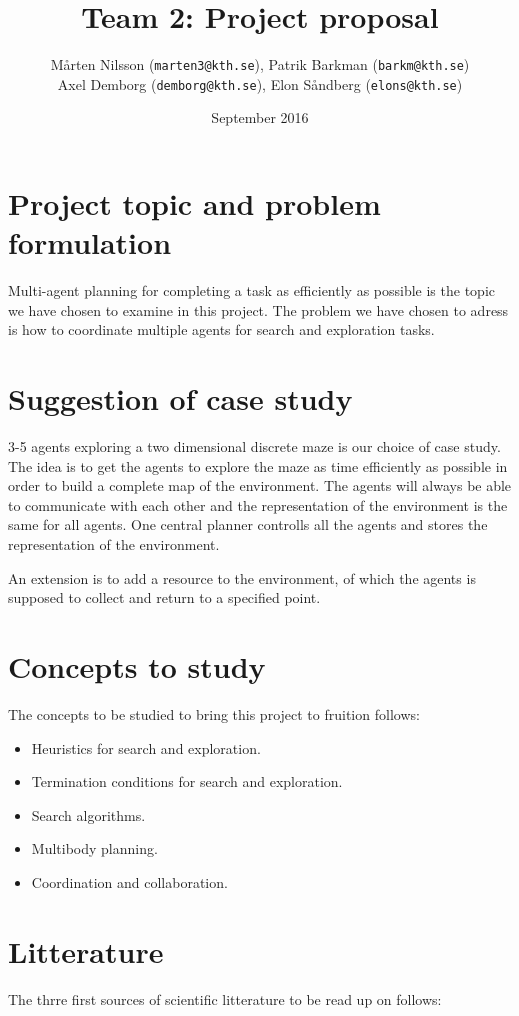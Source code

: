 \documentclass{article}
\title{Team 2: Project proposal}
\author{ Mårten Nilsson (\texttt{marten3@kth.se}), Patrik Barkman (\texttt{barkm@kth.se})\\ Axel Demborg (\texttt{demborg@kth.se}), Elon Såndberg (\texttt{elons@kth.se})}
\date{September 2016}
\begin{document}
\maketitle

\thispagestyle{empty}


\section{Project topic and problem formulation}
Multi-agent planning for completing a task as efficiently as possible is the topic we have chosen to examine in this project. The problem we have chosen to adress is how to coordinate multiple agents for search and exploration tasks.  

\section{Suggestion of case study}

3-5 agents exploring a two dimensional discrete maze is our choice of case study. The idea is to get the agents to explore the maze as time efficiently as possible in order to build a complete map of the environment. The agents will always be able to communicate with each other and the representation of the environment is the same for all agents. One central planner controlls all the agents and stores the representation of the environment. 

An extension is to add a resource to the environment, of which the agents is supposed to collect and return to a specified point.  

\section{Concepts to study}
The concepts to be studied to bring this project to fruition follows:

\begin{itemize}
\item Heuristics for search and exploration. 
\item Termination conditions for search and exploration.
\item Search algorithms. 
\item Multibody planning.
\item Coordination and collaboration.
\end{itemize}

\section{Litterature}
The thrre first sources of scientific litterature to be read up on follows:
\end{document}
